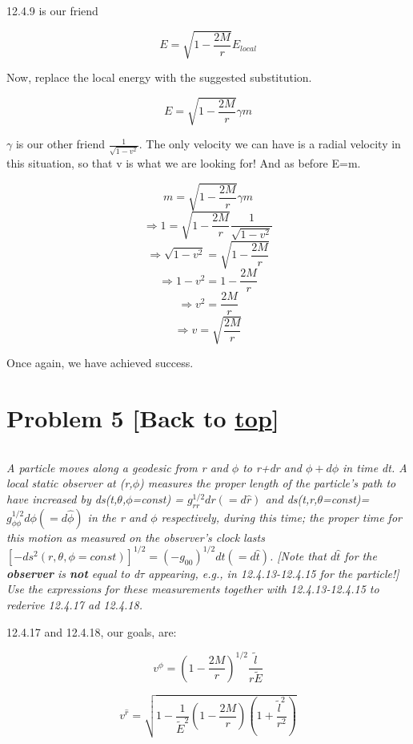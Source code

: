 \documentclass[landscape,letterpaper,10pt,english]{article}
\begin{document}
    12.4.9 is our friend

\[ E = \sqrt{1-\frac{2M}{r}} E_{local}\]

    Now, replace the local energy with the suggested substitution.

\[ E = \sqrt{1-\frac{2M}{r}} \gamma m \]

\(\gamma\) is our other friend \(\frac{1}{\sqrt{1-v^2}}\). The only
velocity we can have is a radial velocity in this situation, so that v
is what we are looking for! And as before E=m.

\[ m = \sqrt{1-\frac{2M}{r}} \gamma m \]
\[ \Rightarrow 1 = \sqrt{1-\frac{2M}{r}} \frac{1}{\sqrt{1-v^2}}\]
\[ \Rightarrow \sqrt{1-v^2} = \sqrt{1-\frac{2M}{r}} \]
\[ \Rightarrow 1-v^2 = 1-\frac{2M}{r} \]
\[ \Rightarrow v^2 = \frac{2M}{r} \]
\[ \Rightarrow v = \sqrt{\frac{2M}{r}} \]

Once again, we have achieved success.

    \hypertarget{problem-5-back-to-top}{%
\section{\texorpdfstring{Problem 5 {[}Back to
\hyperref[toc]{top}{]}}{Problem 5 {[}Back to {]}}}\label{problem-5-back-to-top}}

\[\label{P5}\]

\emph{A particle moves along a geodesic from r and \(\phi\) to r+dr and
\(\phi + d\phi\) in time dt. A local static observer at (r,\(\phi\))
measures the proper length of the particle's path to have increased by
ds(t,\(\theta\),\(\phi\)=const) = \(g^{1/2}_{rr} dr(=d\hat r)\) and
ds(t,r,\(\theta\)=const)=\(g^{1/2}_{\phi\phi} d\phi (=d\hat\phi)\) in
the r and \(\phi\) respectively, during this time; the proper time for
this motion as measured on the observer's clock lasts
\([-ds^2(r,\theta,\phi=const)]^{1/2} = (-g_{00})^{1/2} dt (=d\hat t)\).
{[}Note that \(d\hat t\) for the \textbf{observer} is \textbf{not} equal
to d\(\tau\) appearing, e.g., in 12.4.13-12.4.15 for the particle!{]}
Use the expressions for these measurements together with 12.4.13-12.4.15
to rederive 12.4.17 ad 12.4.18.}

    12.4.17 and 12.4.18, our goals, are:

\[ v^\hat{\phi} = \left( 1 - \frac{2M}{r} \right)^{1/2} \frac{\tilde l}{r\tilde E} \]

\[ v^{\hat r} = \sqrt{1 - \frac{1}{\tilde E^2} \left( 1-\frac{2M}{r} \right) \left( 1+\frac{\tilde l^2}{r^2} \right) } \]
\end{document}

